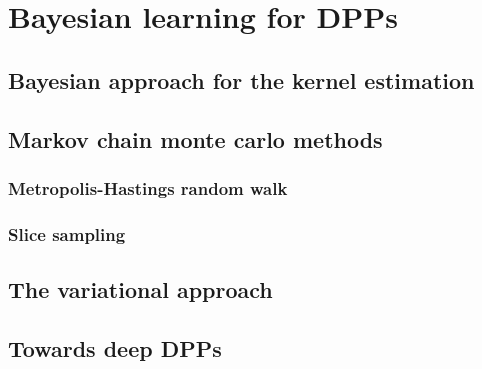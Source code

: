 \chapter{Bayesian learning for DPPs}

\section{Bayesian approach for the kernel estimation}

\section{Markov chain monte carlo methods}

\subsection{Metropolis-Hastings random walk}

\subsection{Slice sampling}

\section{The variational approach}

\section{Towards deep DPPs}

